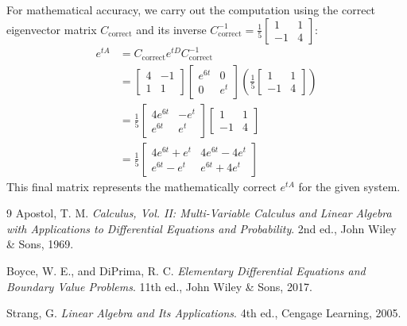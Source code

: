 \documentclass[12pt,a4paper]{report}
\theoremstyle{definition}
\numberwithin{equation}{chapter}
\begin{document}
For mathematical accuracy, we carry out the computation using the correct eigenvector matrix $C_{\text{correct}}$ and its inverse $C_{\text{correct}}^{-1} = \frac{1}{5} \begin{bmatrix} 1 & 1 \\ -1 & 4 \end{bmatrix}$:
\begin{equation}
\begin{aligned}
e^{tA} &= C_{\text{correct}} e^{tD} C_{\text{correct}}^{-1} \\
&= \begin{bmatrix} 4 & -1 \\ 1 & 1 \end{bmatrix} \begin{bmatrix} e^{6t} & 0 \\ 0 & e^t \end{bmatrix} \left( \frac{1}{5} \begin{bmatrix} 1 & 1 \\ -1 & 4 \end{bmatrix} \right) \\
&= \frac{1}{5} \begin{bmatrix} 4e^{6t} & -e^t \\ e^{6t} & e^t \end{bmatrix} \begin{bmatrix} 1 & 1 \\ -1 & 4 \end{bmatrix} \\
&= \frac{1}{5} \begin{bmatrix} 4e^{6t} + e^t & 4e^{6t} - 4e^t \\ e^{6t} - e^t & e^{6t} + 4e^t \end{bmatrix}
\end{aligned}
\end{equation}
This final matrix represents the mathematically correct $e^{tA}$ for the given system.


\begin{thebibliography}{9}
Apostol, T. M. \emph{Calculus, Vol. II: Multi-Variable Calculus and Linear Algebra with Applications to Differential Equations and Probability}. 2nd ed., John Wiley \& Sons, 1969.

Boyce, W. E., and DiPrima, R. C. \emph{Elementary Differential Equations and Boundary Value Problems}. 11th ed., John Wiley \& Sons, 2017.

Strang, G. \emph{Linear Algebra and Its Applications}. 4th ed., Cengage Learning, 2005.
\end{thebibliography}
\end{document}
